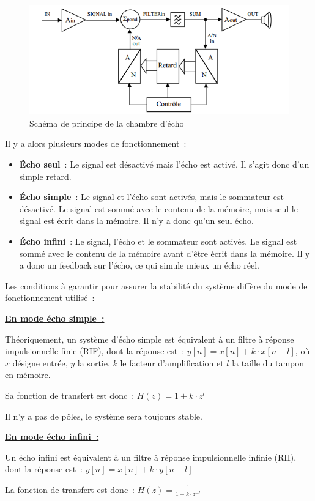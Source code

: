 \documentclass{article}
\begin{document}
\begin{figure}[h]
	\centering
	\includegraphics[width=.4\textwidth]{principe_chambre_d'echo.png}
	\caption{Schéma de principe de la chambre d'écho}
	\label{fig:chambre_echo}
\end{figure}

Il y a alors plusieurs modes de fonctionnement~:
\begin{itemize}
\item \textbf{Écho seul}~: Le signal est désactivé mais l'écho est activé. Il s'agit donc d'un simple retard.
\item \textbf{Écho simple}~: Le signal et l'écho sont activés, mais le sommateur est désactivé. Le signal est sommé avec le contenu de la mémoire, mais seul le signal est écrit dans la mémoire. Il n'y a donc qu'un seul écho.
\item \textbf{Écho infini}~: Le signal, l'écho et le sommateur sont activés. Le signal est sommé avec le contenu de la mémoire avant d'être écrit dans la mémoire. Il y a donc un feedback sur l'écho, ce qui simule mieux un écho réel.
\end{itemize}


Les conditions à garantir pour assurer la stabilité du système diffère du mode de fonctionnement utilisé~:

\noindent \textbf{\underline{En mode écho simple~:}}

Théoriquement, un système d'écho simple est équivalent à un filtre à réponse impulsionnelle finie (RIF), dont la réponse est~: $y[n] = x[n] + k \cdot x[n-l]$,
où $x$ désigne entrée, $y$ la sortie, $k$ le facteur d'amplification et $l$ la taille du tampon en mémoire.

Sa fonction de transfert est donc~: $H(z) = 1 + k \cdot z^l$

Il n'y a pas de pôles, le système sera toujours stable.

\noindent \textbf{\underline{En mode écho infini~:}}

Un écho infini est équivalent à un filtre à réponse impulsionnelle infinie (RII), dont la réponse est~: $y[n] = x[n] + k \cdot y[n-l]$

La fonction de transfert est donc~: $H(z) = \frac{1}{1 - k \cdot z^{-l}}$
\end{document}
